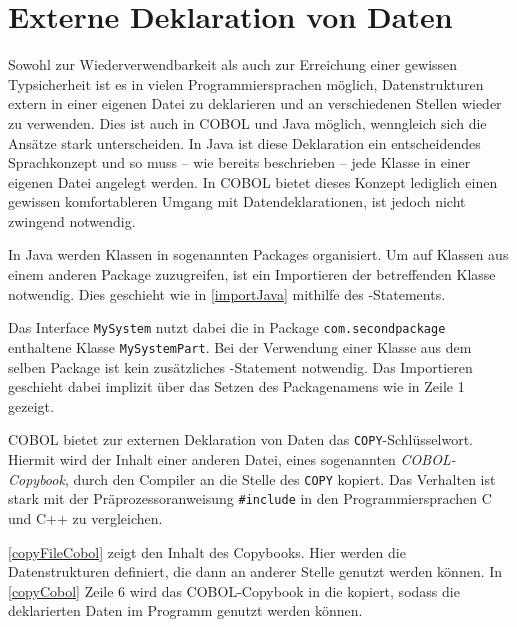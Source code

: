 \section{Externe Deklaration von Daten} 
Sowohl zur Wiederverwendbarkeit als auch zur Erreichung einer gewissen Typsicherheit ist es in vielen Programmiersprachen möglich, Datenstrukturen extern in einer eigenen Datei zu deklarieren und an verschiedenen Stellen wieder zu verwenden. Dies ist auch in COBOL und Java möglich, wenngleich sich die Ansätze stark unterscheiden. In Java ist diese Deklaration ein entscheidendes Sprachkonzept und so muss -- wie bereits beschrieben -- jede Klasse in einer eigenen Datei angelegt werden. In COBOL bietet dieses Konzept lediglich einen gewissen komfortableren Umgang mit Datendeklarationen, ist jedoch nicht zwingend notwendig.

In Java werden Klassen in sogenannten Packages organisiert. Um auf Klassen aus einem anderen Package zuzugreifen, ist ein Importieren der betreffenden Klasse notwendig. Dies geschieht wie in \autoref{importJava} mithilfe des -Statements.

Das Interface \texttt{MySystem} nutzt dabei die in Package \texttt{com.secondpackage} enthaltene Klasse \texttt{MySystemPart}. Bei der Verwendung einer Klasse aus dem selben Package ist kein zusätzliches -Statement notwendig. Das Importieren geschieht dabei implizit über das Setzen des Packagenamens wie in Zeile 1 gezeigt.

COBOL bietet zur externen Deklaration von Daten das \texttt{COPY}-Schlüsselwort. Hiermit wird der Inhalt einer anderen Datei, eines sogenannten \textit{COBOL-Copybook}, durch den Compiler an die Stelle des \texttt{COPY} kopiert. Das Verhalten ist stark mit der Präprozessoranweisung \texttt{#include} in den Programmiersprachen C und C++ zu vergleichen.



\autoref{copyFileCobol} zeigt den Inhalt des Copybooks. Hier werden die Datenstrukturen definiert, die dann an anderer Stelle genutzt werden können. In \autoref{copyCobol} Zeile 6 wird das COBOL-Copybook in die  kopiert, sodass die deklarierten Daten im Programm genutzt werden können.

